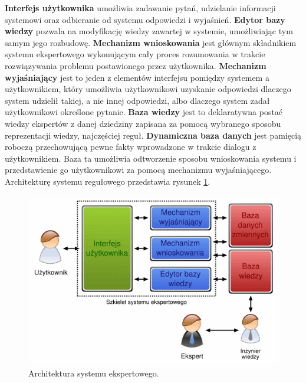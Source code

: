 \textbf{Interfejs użytkownika} umożliwia zadawanie pytań, udzielanie informacji systemowi oraz odbieranie od systemu odpowiedzi i wyjaśnień.
\textbf{Edytor bazy wiedzy} pozwala na modyfikację wiedzy zawartej w systemie, umożliwiając tym samym jego rozbudowę.
\textbf{Mechanizm wnioskowania} jest głównym składnikiem systemu ekspertowego wykonującym cały proces rozumowania w trakcie rozwiązywania problemu postawionego przez użytkownika.
\textbf{Mechanizm wyjaśniający} jest to jeden z elementów interfejsu pomiędzy systemem a użytkownikiem, który umożliwia użytkownikowi uzyskanie odpowiedzi dlaczego system udzielił takiej, a nie innej odpowiedzi, albo dlaczego system zadał użytkownikowi określone pytanie.
\textbf{Baza wiedzy} jest to deklaratywna postać wiedzy ekspertów z danej dziedziny zapisana za pomocą wybranego sposobu reprezentacji wiedzy, najczęściej reguł.
\textbf{Dynamiczna baza danych} jest pamięcią roboczą przechowującą pewne fakty wprowadzone w trakcie dialogu z użytkownikiem. Baza ta umożliwia odtworzenie sposobu wnioskowania systemu i przedstawienie go użytkownikowi za pomocą mechanizmu wyjaśniającego\cite{martyniuk_ekspertowe}.
Architekturę systemu regułowego przedstawia rysunek \ref{img:rysunek_expert}.
\begin{figure}[!ht]
\centering	
\includegraphics[scale=0.5]{images/expert-system}
\caption[Rysunek przedstawiający model architektury systemu ekspertowego]{Architektura systemu ekspertowego.}
\label{img:rysunek_expert}
\end{figure}

